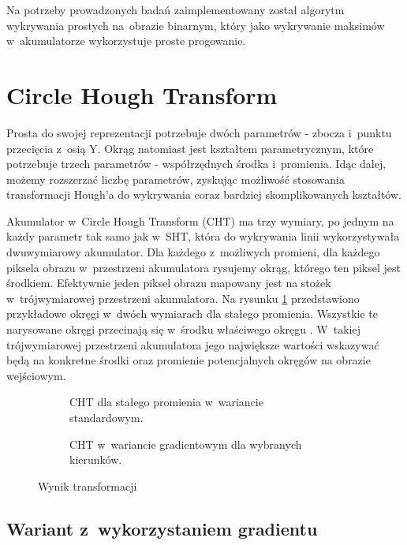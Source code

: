 Na potrzeby prowadzonych badań zaimplementowany został algorytm wykrywania prostych na~obrazie binarnym, który jako wykrywanie maksimów w~akumulatorze wykorzystuje proste progowanie.

\section{Circle Hough Transform}

Prosta do swojej reprezentacji potrzebuje dwóch parametrów - zbocza i~punktu przecięcia z~osią Y. Okrąg natomiast jest kształtem parametrycznym, które potrzebuje trzech parametrów - współrzędnych środka i~promienia. Idąc dalej, możemy rozszerzać liczbę parametrów, zyskując możliwość stosowania transformacji Hough'a do wykrywania coraz bardziej skomplikowanych kształtów.

Akumulator w~Circle Hough Transform (CHT) ma trzy wymiary, po jednym na każdy parametr tak samo jak w~SHT, która do wykrywania linii wykorzystywała dwuwymiarowy akumulator. Dla każdego z~możliwych promieni, dla każdego piksela obrazu w~przestrzeni akumulatora rysujemy okrąg, którego ten piksel jest środkiem. Efektywnie jeden piksel obrazu mapowany jest na stożek w~trójwymiarowej przestrzeni akumulatora. Na rysunku \ref{fig:houghCircleStandard} przedstawiono przykładowe okręgi  w~dwóch wymiarach dla stałego promienia. Wszystkie te narysowane okręgi przecinają się w~środku właściwego okręgu \cite{mukhopadhyay2015survey}. W~takiej trójwymiarowej przestrzeni akumulatora jego największe wartości wskazywać będą na konkretne środki oraz promienie potencjalnych okręgów na obrazie wejściowym.

\begin{figure}
    \centering
    \begin{subfigure}{0.45\textwidth}
        \centering
        
        \caption{CHT dla stałego promienia w~wariancie standardowym.}
        \label{fig:houghCircleStandard}
    \end{subfigure}\hfill
    \begin{subfigure}{0.45\textwidth}
        \centering
        
        \caption{CHT w~wariancie gradientowym dla wybranych kierunków.}
        \label{fig:houghCircleGradient}
        \vfill
    \end{subfigure}
    \caption{Wynik transformacji}\label{fig:houghCircle}
\end{figure}

\subsection{Wariant z~wykorzystaniem gradientu}

